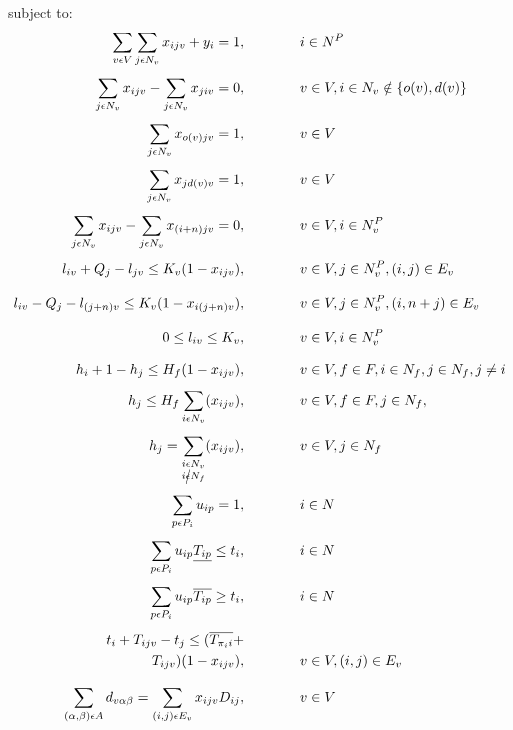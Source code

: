 \documentclass[a4paper,10pt]{article}
\begin{document}
subject to:
\begingroup
    \allowdisplaybreaks
\begin{alignat} {2}
    	\sum_{v\epsilon V}\sum_{j\epsilon N_v}x_{ijv} + y_i = 1,		&\quad\quad\quad&& 	 i \in N^P 				\label{eq:2} 	\\[4pt]
    	\sum_{j\epsilon N_v}x_{ijv} - \sum_{j\epsilon N_v}x_{jiv} = 0,		& 	&&	v \in V, i\in N_v \notin \{o(v), d(v)\}		\label{eq:3} 	\\[4pt]
    	\sum_{j\epsilon N_v}x_{o(v)jv} = 1,					& 	&&	v \in V 					\label{eq:4}	\\[4pt]
    	\sum_{j\epsilon N_v}x_{j d(v)v} = 1,					& 	&&	v \in V 					\label{eq:5}	\\[4pt]
    	\sum_{j\epsilon N_v}x_{ijv} - \sum_{j\epsilon N_v}x_{(i+n)jv} = 0,	& 	&&	v \in V, i\in N^P_v 				\label{eq:6}	\\[4pt]
    	l_{iv} + Q_j - l_{jv} \leq K_v(1-x_{ijv}),				& 	&&	v \in V, j\in N_v^P, (i,j) \in E_v 		\label{eq:7} 	\\[8pt]
    	l_{iv} - Q_j - l_{(j+n)v} \leq K_v(1-x_{i(j+n)v}),			& 	&&	v \in V ,j\in N_v^P, (i, n+j)\in E_v 		\label{eq:8}	\\[8pt]
    	0 \leq l_{iv} \leq K_v,							& 	&&	v \in V, i \in N^P_v 				\label{eq:9}	\\[8pt]
    	h_{i} + 1 - h_{j} \leq H_f(1-x_{ijv}),					& 	&&	v \in V, f\in F,  i \in N_f, j \in N_f, j\neq i 	\label{eq:10}	\\[4pt]
    	h_{j} \leq H_f\sum_{i\epsilon N_v}(x_{ijv}),				& 	&&	v \in V,f\in F, j\in N_f,  			\label{eq:11}	\\[4pt]
    	h_{j} = \sum_{\substack{i\epsilon N_v\\i\cancel{\epsilon} N_f}}(x_{ijv}),					& 	&&	v \in V, j \in N_f	\label{eq:12}	\\[4pt]
    	\sum_{p\epsilon P_i} u_{ip} = 1,						& 	&& 	i \in N 					\label{eq:13}	\\[4pt]
    	\sum_{p\epsilon P_i} u_{ip}\underline{T_{ip}} \leq t_{i},			& 	&&	i \in N 					\label{eq:14}	\\[4pt]
    	\sum_{p\epsilon P_i} u_{ip}\overline{T_{ip}} \geq t_{i},			& 	&& 	i \in N 					\label{eq:15}	\\[4pt]
    	t_{i} + T_{ijv} - t_{j} \leq (\overline{T_{\pi_i i}} + 			& 	&&						\nonumber\\
    	T_{ijv})(1 - x_{ijv}),							& 	&& 	v \in V, (i,j) \in E_v				\label{eq:16}	\\[8pt]
    	\sum_{(\alpha,\beta)\epsilon A}d_{v\alpha\beta} = 
	\sum_{(i,j) \epsilon E_v} x_{ijv}D_{ij},					& 	&&	v \in V						\label{eq:17}	\\[4pt]

\end{alignat}
\end{document}
